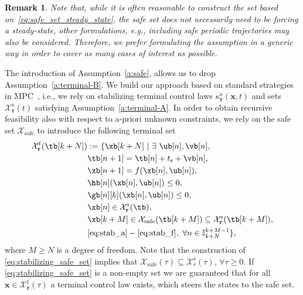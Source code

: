 \documentclass[journal]{IEEEtran}
\newcommand{\x}{{\mathbf{x}}}
\renewcommand{\r}{{\mathbf{r}}}
\newcommand{\review}[1]{#1}
\newtheorem{Remark}{Remark}
\begin{document}
	\begin{Remark}
		Note that, while it is often reasonable to construct the set based on~\eqref{eq:safe_set_steady_state}, the safe set does not necessarily need to be forcing a steady-state, \review{other formulations, e.g., including safe periodic trajectories may also be considered.} Therefore, we prefer formulating the assumption in a generic way in order to cover as many cases of interest as possible.
	\end{Remark}
	
	The introduction of Assumption~\ref{a:safe}, allows us to drop Assumption~\ref{a:terminal-B}. We build our approach based on standard strategies in MPC~\cite{borrelli2017predictive,kerrigan2001robust,yu2013tube}, i.e., we rely on stabilizing terminal control laws $\kappa_\r^\mathrm{s}(\x,t)$ and sets $\mathcal{X}_\r^\mathrm{s}(t)$ satisfying Assumption~\ref{a:terminal-A}. 
		In order to obtain recursive feasibility also with respect to a-priori unknown constraints, we rely on the safe set $\mathcal{X}_\mathrm{safe}$ to introduce the following terminal set
	\begin{subequations}\label{eq:stabilizing_safe_set}
		\begin{align}
		\mathcal{X}^\mathrm{f}_\r(\tb[k+N]) &:=  \{\xb[k+N] \ | \ \exists \ \ub[n], \vb[n],  \label{eq:stab_a}\\
		&\tb[n+1]=\tb[n]+t_\mathrm{s} + \vb[n],\label{eq:stab_b}\\
		&\xb[n+1] =f(\xb[n],\ub[n]) ,  \\
		&\hb[n](\xb[n],\ub[n]) \leq{} 0,\\
		&\gb[n][k](\xb[n],\ub[n]) \leq{} 0,\\
		&\xb[n] \in \mathcal{X}^\mathrm{s}_\r(\tb), \label{eq:stab_f}\\
		&\xb[k+M]\in\mathcal{X}_\mathrm{safe}(\tb[k+M])\subseteq\mathcal{X}_\r^\mathrm{s}(\tb[k+M]),\label{eq:stab_g}\\
		& \eqref{eq:stab_a}-\eqref{eq:stab_f},\ \forall n\in \mathbb{I}_{k+N}^{k+M-1}\},\label{eq:stab_h}
		\end{align}
 	\end{subequations}
	where $M\geq{}N$ is a degree of freedom. Note that the construction of \eqref{eq:stabilizing_safe_set} implies that $\mathcal{X}_\mathrm{safe}(\tau)\subseteq{}\mathcal{X}_r^\mathrm{s}(\tau)$, $\forall\tau\geq{}0$. If \eqref{eq:stabilizing_safe_set} is a non-empty set we are guaranteed that for all $\x\in\mathcal{X}_\r^\mathrm{f}(\tau)$ a terminal control law exists,  which steers the states to the safe set.
	
\end{document}
